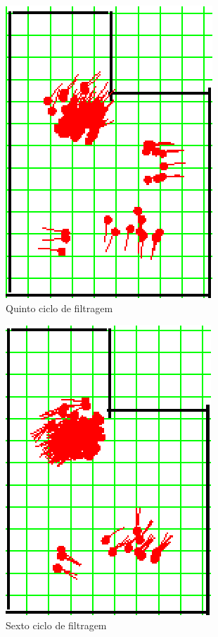\begin{figure}[H]
  \centering
  \includegraphics[scale=1]{figuras/cen1_ex2/6.eps}
  \caption[Quinto Ciclo de Filtragem]{Quinto ciclo de filtragem}
  \label{img:cen1_ex2_6}
\end{figure}

\begin{figure}[H]
  \centering
  \includegraphics[scale=1]{figuras/cen1_ex2/7.eps}
  \caption[Sexto Ciclo de Filtragem]{Sexto ciclo de filtragem}
  \label{img:cen1_ex2_7}
\end{figure}

